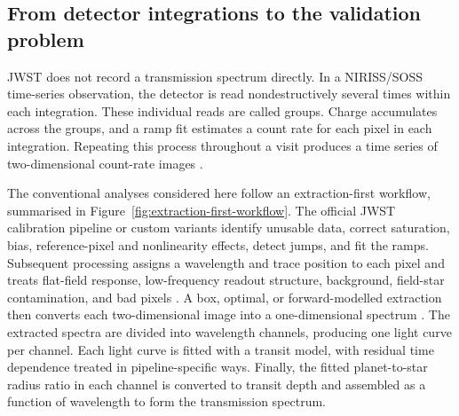 \subsection{From detector integrations to the validation problem}
\label{sec:detector-to-validation}
\label{sec:detector-to-spectrum}
\label{sec:validation-problem}


JWST does not record a transmission spectrum directly. In a NIRISS/SOSS
time-series observation, the detector is read nondestructively several times
within each integration. These individual reads are called groups. Charge
accumulates across the groups, and a ramp fit estimates a count rate for each
pixel in each integration. Repeating this process throughout a visit produces a
time series of two-dimensional count-rate images
\citep{AlbertEtAl2023}.


The conventional analyses considered here follow an extraction-first workflow,
summarised in Figure~\ref{fig:extraction-first-workflow}. The official JWST
calibration pipeline or custom variants identify unusable data, correct
saturation, bias, reference-pixel and nonlinearity effects, detect jumps, and
fit the ramps. Subsequent processing assigns a wavelength and trace position to
each pixel and treats flat-field response, low-frequency readout structure,
background, field-star contamination, and bad pixels
\citep{BellEtAl2022,RadicaEtAl2023,LouieEtAl2025}. A box, optimal, or
forward-modelled extraction then converts each two-dimensional image into a
one-dimensional spectrum \citep{Horne1986,DarveauBernierEtAl2022}. The
extracted spectra are divided into wavelength channels, producing one light
curve per channel. Each light curve is fitted with a transit model, with
residual time dependence treated in pipeline-specific ways. Finally, the
fitted planet-to-star radius ratio in each channel is converted to transit
depth and assembled as a function of wavelength to form the transmission
spectrum.

